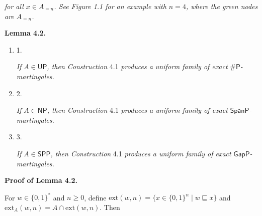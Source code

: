\emph{for all $x\in A_{=n}$.
See Figure 1.1 for an example with $n=4$, where the green nodes are $A_{=n}$.}\par







\par\medskip\noindent\textbf{
\textbf{Lemma 4.2}\textbf{.}
}\par



\begin{enumerate}


\item[] 
1. 


\emph{If }$A\in\mathsf{UP}$\emph{, then Construction }4.1\emph{ produces a uniform family of exact }${\mathsf{\#}\mathsf{P}}$\emph{-martingales.}\par





\item[] 
2. 


\emph{If }$A\in\mathsf{NP}$\emph{, then Construction }4.1\emph{ produces a uniform family of exact }$\mathsf{SpanP}$\emph{-martingales.}\par





\item[] 
3. 


\emph{If }$A\in\mathsf{SPP}$\emph{, then Construction }4.1\emph{ produces a uniform family of exact }$\mathsf{GapP}$\emph{-martingales.}\par





\end{enumerate}






\par\medskip\noindent\textbf{Proof of Lemma 4.2.}\par




For $w\in\{0,1\}^{*}$ and $n\geq 0$, define $\mathrm{ext}(w,n)=\{x\in\{0,1\}^{n}\mid w\sqsubseteq x\}$ and
$\mathrm{ext}_{A}(w,n)=A\cap\mathrm{ext}(w,n)$. Then\par


